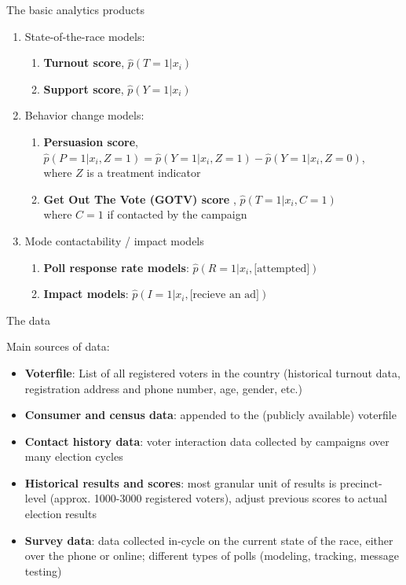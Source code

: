 \documentclass[ignorenonframetext,]{beamer}
\begin{document}
\begin{frame}{The basic analytics products}

\pause
\begin{enumerate}
	\item State-of-the-race models:
	\begin{enumerate}
		\item \textbf{Turnout score}, $\hat{p}(T = 1|x_i)$
		\item \textbf{Support score}, $\hat{p}(Y = 1|x_i)$
	\end{enumerate}
\pause
	\item Behavior change models:
	\begin{enumerate}
		\item \textbf{Persuasion score}, $\hat{p}(P = 1 | x_i, Z = 1) = \hat{p}(Y = 1 | x_i, Z = 1) - \hat{p}(Y = 1 | x_i, Z = 0)$, \\where $Z$ is a treatment indicator
		\item \textbf{Get Out The Vote (GOTV) score} , $\hat{p}(T=1 | x_i, C = 1)$ \\where $C=1$ if contacted by the campaign
	\end{enumerate}
\pause
	\item Mode contactability / impact models
	\begin{enumerate}
		\item \textbf{Poll response rate models}: $\hat{p}(R= 1|x_i, \text{[attempted]})$
		\item \textbf{Impact models}: $\hat{p}(I = 1|x_i, \text{[recieve an ad]})$
	\end{enumerate}
	

\end{enumerate}




\end{frame}

\begin{frame}{The data}

Main sources of data:
\begin{itemize}
	\item<2-> \textbf{Voterfile}: List of all registered voters in the country (historical turnout data, registration address and phone number, age, gender, etc.)
	\item<3-> \textbf{Consumer and census data}: appended to the (publicly available) voterfile
	\item<4-> \textbf{Contact history data}: voter interaction data collected by campaigns over many election cycles
	\item<5-> \textbf{Historical results and scores}: most granular unit of results is precinct-level (approx. 1000-3000 registered voters), adjust previous scores to actual election results
	\item<6-> \textbf{Survey data}: data collected in-cycle on the current state of the race, either over the phone or online; different types of polls (modeling, tracking, message testing)
\end{itemize}
\end{frame}
\end{document}
